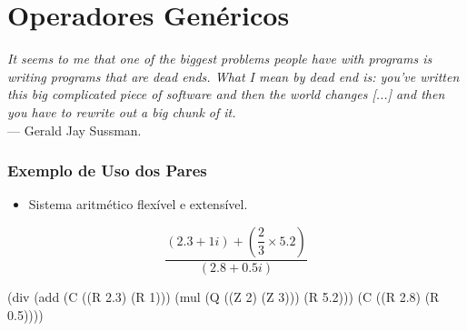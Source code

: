 
\section{Operadores Genéricos}

\begin{frame}
  \begin{center}
    \textit{It seems to me that one of the biggest problems people have with programs is writing programs that are dead ends. What I mean by dead end is: you've written this big complicated piece of software and then the world changes [...] and then you have to rewrite out a big chunk of it.}\\
        --- Gerald Jay Sussman.
    \end{center}
\end{frame}

\begin{frame}[fragile]
  \frametitle{Exemplo de Uso dos Pares}

  \begin{itemize}
    \item Sistema aritmético flexível e extensível.
  \end{itemize}

  \pause

  \[\dfrac{(2.3 + 1i) + \left(\dfrac{2}{3} \times 5.2\right)}{(2.8 + 0.5i)}\]
  \vspace{2em}
  \pause

  \begin{code}
              (div (add (C ((R 2.3) (R 1)))
                        (mul (Q ((Z 2) (Z 3)))
                             (R 5.2)))
                   (C ((R 2.8) (R 0.5))))
  \end{code}
  \vspace{1em}
\end{frame}


